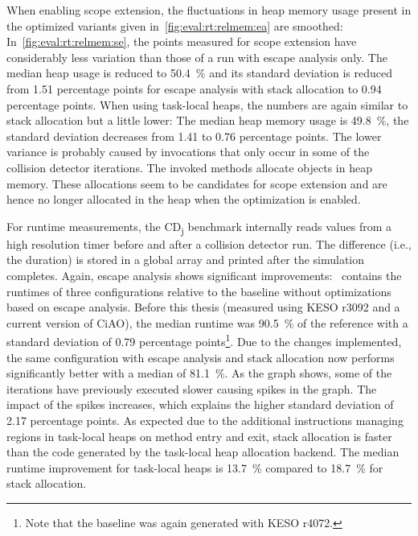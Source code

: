 		When enabling scope extension, the fluctuations in heap memory usage present in the optimized variants given
		in~\cref{fig:eval:rt:relmem:ea} are smoothed: In~\cref{fig:eval:rt:relmem:se}, the points measured for scope
		extension have considerably less variation than those of a run with escape analysis only. The median heap usage is
		reduced to 50.4~\% and its standard deviation is reduced from 1.51 percentage points for escape analysis with stack
		allocation to 0.94 percentage points. When using task-local heaps, the numbers are again similar to stack allocation
		but a little lower: The median heap memory usage is 49.8~\%, the standard deviation decreases from 1.41 to 0.76
		percentage points. The lower variance is probably caused by invocations that only occur in some of the collision
		detector iterations. The invoked methods allocate objects in heap memory. These allocations seem to be candidates
		for scope extension and are hence no longer allocated in the heap when the optimization is enabled.

		For runtime measurements, the CD\textsubscript{j} benchmark internally reads values from a high resolution timer
		before and after a collision detector run. The difference (i.e., the duration) is stored in a global array and
		printed after the simulation completes. Again, escape analysis shows significant
		improvements:~ contains the runtimes of three configurations relative to the baseline
		without optimizations based on escape analysis. Before this thesis (measured using KESO r3092 and a current version
		of CiAO), the median runtime was 90.5~\% of the reference with a standard deviation of 0.79 percentage
		points\footnote{Note that the baseline was again generated with KESO r4072.}. Due to the changes implemented, the
		same configuration with escape analysis and stack allocation now performs significantly better with a median of
		81.1~\%. As the graph shows, some of the iterations have previously executed slower causing spikes in the graph. The
		impact of the spikes increases, which explains the higher standard deviation of 2.17 percentage points. As expected
		due to the additional instructions managing regions in task-local heaps on method entry and exit, stack allocation
		is faster than the code generated by the task-local heap allocation backend. The median runtime improvement for
		task-local heaps is 13.7~\% compared to 18.7~\% for stack allocation.


